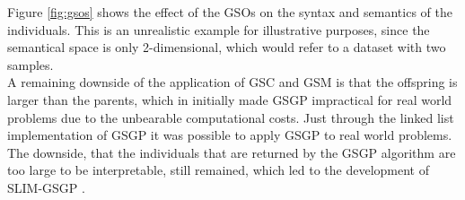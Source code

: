 \documentclass[manuscript, review, anonymous]{acmart} %
\begin{document}

\noindent Figure \ref{fig:gsos} shows the effect of the GSOs on the
syntax and semantics of the individuals.
This is an unrealistic example for illustrative purposes, since the
semantical space is only 2-dimensional,
which would refer to a dataset with two samples.\\
A remaining downside of the application of GSC and GSM is
that the offspring is larger than the parents,
which in initially made GSGP impractical for real world problems
due to the unbearable computational costs.
Just through the linked list implementation of GSGP \cite{Vanneschi2013} it
was possible to apply GSGP to real world problems.
The downside, that the individuals that are returned by the
GSGP algorithm are too large to be interpretable, still remained,
which led
to the development of SLIM-GSGP \cite{Vanneschi2024}.
\end{document}
